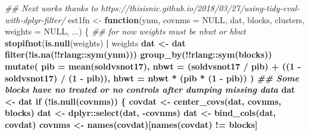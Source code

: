 \documentclass[11pt,]{article}
\newenvironment{Shaded}{\begin{snugshade}}{\end{snugshade}}
\newcommand{\CommentTok}[1]{\textcolor[rgb]{0.56,0.35,0.01}{\textit{#1}}}
\newcommand{\ControlFlowTok}[1]{\textcolor[rgb]{0.13,0.29,0.53}{\textbf{#1}}}
\newcommand{\DataTypeTok}[1]{\textcolor[rgb]{0.13,0.29,0.53}{#1}}
\newcommand{\DecValTok}[1]{\textcolor[rgb]{0.00,0.00,0.81}{#1}}
\newcommand{\KeywordTok}[1]{\textcolor[rgb]{0.13,0.29,0.53}{\textbf{#1}}}
\newcommand{\NormalTok}[1]{#1}
\newcommand{\OperatorTok}[1]{\textcolor[rgb]{0.81,0.36,0.00}{\textbf{#1}}}
\newcommand{\OtherTok}[1]{\textcolor[rgb]{0.56,0.35,0.01}{#1}}
\newcommand{\StringTok}[1]{\textcolor[rgb]{0.31,0.60,0.02}{#1}}
\begin{document}
\begin{Shaded}
\begin{Highlighting}[]
{{\CommentTok{## Next works thanks to https://thisisnic.github.io/2018/03/27/using-tidy-eval-with-dplyr-filter/}
\NormalTok{est1fn <-}\StringTok{ }\ControlFlowTok{function}\NormalTok{(ynm, }\DataTypeTok{covnms =} \OtherTok{NULL}\NormalTok{, dat, blocks, clusters, }\DataTypeTok{weights =} \OtherTok{NULL}\NormalTok{, ...) \{}
  \CommentTok{## for now weights must be nbwt or hbwt}
  \KeywordTok{stopifnot}\NormalTok{(}\KeywordTok{is.null}\NormalTok{(weights) }\OperatorTok{|}\StringTok{ }\NormalTok{weights }\OperatorTok{%in%}\StringTok{ }\KeywordTok{c}\NormalTok{(}\StringTok{"nbwt"}\NormalTok{, }\StringTok{"hbwt"}\NormalTok{))}
\NormalTok{  dat <-}\StringTok{ }\NormalTok{dat }\OperatorTok{%>%}
\StringTok{    }\KeywordTok{filter}\NormalTok{(}\OperatorTok{!}\KeywordTok{is.na}\NormalTok{(}\OperatorTok{!!}\NormalTok{rlang}\OperatorTok{::}\KeywordTok{sym}\NormalTok{(ynm))) }\OperatorTok{%>%}
\StringTok{    }\KeywordTok{group_by}\NormalTok{(}\OperatorTok{!!}\NormalTok{rlang}\OperatorTok{::}\KeywordTok{sym}\NormalTok{(blocks)) }\OperatorTok{%>%}
\StringTok{    }\KeywordTok{mutate}\NormalTok{(}
      \DataTypeTok{pib =} \KeywordTok{mean}\NormalTok{(soldvsnot17),}
      \DataTypeTok{nbwt =}\NormalTok{ (soldvsnot17 }\OperatorTok{/}\StringTok{ }\NormalTok{pib) }\OperatorTok{+}\StringTok{ }\NormalTok{((}\DecValTok{1} \OperatorTok{-}\StringTok{ }\NormalTok{soldvsnot17) }\OperatorTok{/}\StringTok{ }\NormalTok{(}\DecValTok{1} \OperatorTok{-}\StringTok{ }\NormalTok{pib)),}
      \DataTypeTok{hbwt =}\NormalTok{ nbwt }\OperatorTok{*}\StringTok{ }\NormalTok{(pib }\OperatorTok{*}\StringTok{ }\NormalTok{(}\DecValTok{1} \OperatorTok{-}\StringTok{ }\NormalTok{pib))}
\NormalTok{    )}
  \CommentTok{## Some blocks have no treated or no controls after dumping missing data}
\NormalTok{  dat <-}\StringTok{ }\NormalTok{dat }\OperatorTok{%>%}\StringTok{ }\KeywordTok{filter}\NormalTok{(pib }\OperatorTok{!=}\StringTok{ }\DecValTok{0} \OperatorTok{&}\StringTok{ }\NormalTok{pib }\OperatorTok{!=}\StringTok{ }\DecValTok{1}\NormalTok{)}
  \ControlFlowTok{if}\NormalTok{ (}\OperatorTok{!}\KeywordTok{is.null}\NormalTok{(covnms)) \{}
\NormalTok{    covdat <-}\StringTok{ }\KeywordTok{center_covs}\NormalTok{(dat, covnms, blocks)}
\NormalTok{    dat <-}\StringTok{ }\NormalTok{dplyr}\OperatorTok{::}\KeywordTok{select}\NormalTok{(dat, }\OperatorTok{-}\NormalTok{covnms)}
\NormalTok{    dat <-}\StringTok{ }\KeywordTok{bind_cols}\NormalTok{(dat, covdat)}
\NormalTok{    covnms <-}\StringTok{ }\KeywordTok{names}\NormalTok{(covdat)[}\KeywordTok{names}\NormalTok{(covdat) }\OperatorTok{!=}\StringTok{ }\NormalTok{blocks]}
}}}}}}}
\end{Highlighting}
\end{Shaded}
\end{document}
